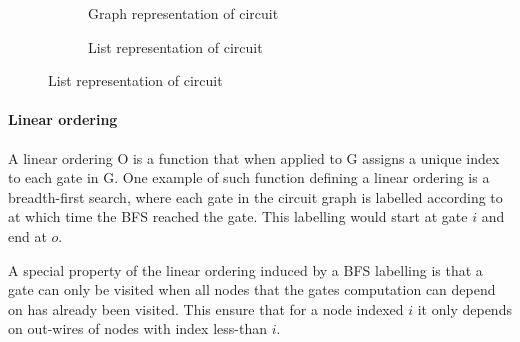 \begin{figure}[ht]
  \centering
  \begin{subfigure}{ 0.48\textwidth }
  \caption{Graph representation of circuit}
  \end{subfigure}
  \hfill
  \begin{subfigure}{ 0.48\textwidth }
  \caption{List representation of circuit}
  \end{subfigure}
\end{figure}

\paragraph{Linear ordering}
A linear ordering O is a function that when applied to G assigns a unique
index to each gate in G.
One example of such function defining a linear ordering is a breadth-first
search, where each gate in the circuit graph is labelled according to at which
time the BFS reached the gate.
This labelling would start at gate $i$ and end at $o$.

A special property of the linear ordering induced by a BFS labelling is that a
gate can only be visited when all nodes that the gates computation can depend on
has already been visited. This ensure that for a node indexed $i$ it only
depends on out-wires of nodes with index less-than $i$.

